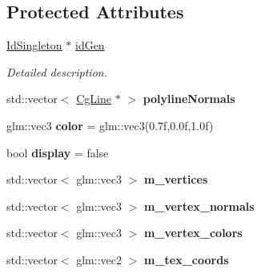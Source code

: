 \subsection*{Protected Attributes}
\begin{DoxyCompactItemize}
\item 
\mbox{\label{class_cg_triangle_mesh_abf87c70cea2e5969d97f2269c0c6ed5d}} 
\hyperlink{class_id_singleton}{Id\+Singleton} $\ast$ \hyperlink{class_cg_triangle_mesh_abf87c70cea2e5969d97f2269c0c6ed5d}{id\+Gen}
\begin{DoxyCompactList}\small\item\em Detailed description. \end{DoxyCompactList}\item 
\mbox{\label{class_cg_triangle_mesh_a7acd23b0d3ff50b7f5bbeec3adc006c3}} 
std\+::vector$<$ \hyperlink{class_cg_line}{Cg\+Line} $\ast$ $>$ {\bfseries polyline\+Normals}
\item 
\mbox{\label{class_cg_triangle_mesh_ab827a25d5ed6f1b2006e1e12c8f3fc74}} 
glm\+::vec3 {\bfseries color} = glm\+::vec3(0.\+7f,0.\+0f,1.\+0f)
\item 
\mbox{\label{class_cg_triangle_mesh_a2fe69985a995b5f94b4bde0b50c10075}} 
bool {\bfseries display} = false
\item 
\mbox{\label{class_cg_triangle_mesh_a08f41981d424e752db53dc8ad0aaf25a}} 
std\+::vector$<$ glm\+::vec3 $>$ {\bfseries m\+\_\+vertices}
\item 
\mbox{\label{class_cg_triangle_mesh_a6efb770301e0d989dba49a0572666af8}} 
std\+::vector$<$ glm\+::vec3 $>$ {\bfseries m\+\_\+vertex\+\_\+normals}
\item 
\mbox{\label{class_cg_triangle_mesh_a935d3e5518c67c410978ad3f58ff3ae9}} 
std\+::vector$<$ glm\+::vec3 $>$ {\bfseries m\+\_\+vertex\+\_\+colors}
\item 
\mbox{\label{class_cg_triangle_mesh_acbee06884be552a8afbf9a4a53131f71}} 
std\+::vector$<$ glm\+::vec2 $>$ {\bfseries m\+\_\+tex\+\_\+coords}
\item 

\end{DoxyCompactItemize}
